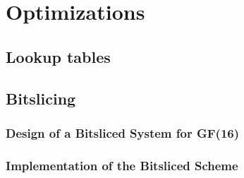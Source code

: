 \section{Optimizations} \label{opti}
\subsection{Lookup tables}
\subsection{Bitslicing}
\subsubsection{Design of a Bitsliced System for GF(16)}
\subsubsection{Implementation of the Bitsliced Scheme}